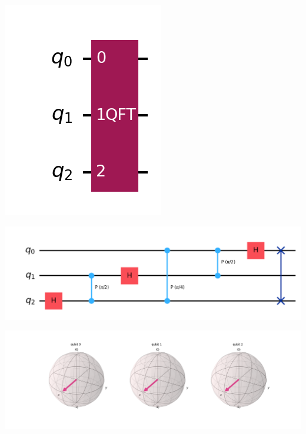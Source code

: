 \documentclass{article}
\begin{document}
\begin{center}
	\includegraphics[scale=0.5]{QFT_1.png}
	\label{fig:QFT}
\end{center}

\begin{center}
	\includegraphics[scale=0.5]{QFT_1_transpiled.png}
	\label{fig:QFT-transpiled}
\end{center}

\begin{center}
	\includegraphics[scale=0.5]{QFT_1_bloch.png}
	\label{fig:QFT-bloch}
\end{center}
\end{document}
